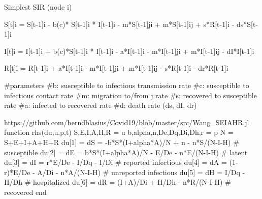 Simplest SIR (node i)

  S[t]i = S[t-1]i - b(c)* S[t-1]i * I[t-1]i - m*S[t-1]ji + m*S[t-1]ij + s*R[t-1]i - ds*S[t-1]i
  
  I[t]i = I[t-1]i + b(c)*S[t-1]i * I[t-1]i - a*I[t-1]i - m*I[t-1]ji + m*I[t-1]ij - dI*I[t-1]i  
  
  R[t]i = R[t-1]i + a*I[t-1]i - m*I[t-1]ji + m*I[t-1]ij - s*R[t-1]i - dr*R[t-1]i
 
  
  #parameters
  #b: susceptible to infectious transmission rate  
  #c: susceptible to infectious contact rate
  #m: migration to/from j rate
  #s: recovered to susceptible rate
  #a: infected to recovered rate
  #d: death rate (ds, dI, dr)



https://github.com/berndblasius/Covid19/blob/master/src/Wang_SEIAHR.jl
function rhs(du,u,p,t)
  S,E,I,A,H,R = u
  b,alpha,n,De,Dq,Di,Dh,r = p
  N = S+E+I+A+H+R
  du[1] = dS = -b*S*(I+alpha*A)/N + n - n*S/(N-I-H)   # susceptible
  du[2] = dE = b*S*(I+alpha*A)/N - E/De - n*E/(N-I-H) # latent
  du[3] = dI = r*E/De - I/Dq - I/Di                   # reported infectious
  du[4] = dA = (1-r)*E/De - A/Di - n*A/(N-I-H)        # unreported infectious
  du[5] = dH = I/Dq - H/Dh                            # hospitalized
  du[6] = dR = (I+A)/Di + H/Dh - n*R/(N-I-H)          # recovered
end


